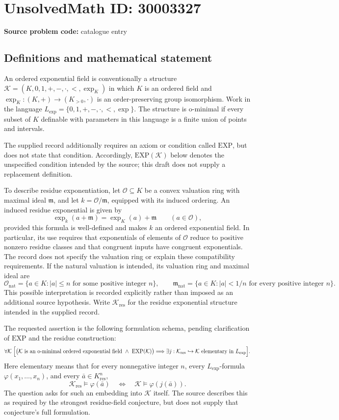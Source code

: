 \documentclass[11pt]{article}
\begin{document}
\section*{UnsolvedMath ID: 30003327}
\textbf{Source problem code:} catalogue entry
\subsection{Definitions and mathematical statement}
An ordered exponential field is conventionally a structure \(\mathcal K=(K,0,1,+,-,\cdot,<,\exp_K)\) in which \(K\) is an ordered field and \(\exp_K:(K,+)\to(K_{>0},\cdot)\) is an order-preserving group isomorphism. Work in the language \(L_{\exp}=\{0,1,+,-,\cdot,<,\exp\}\). The structure is o-minimal if every subset of \(K\) definable with parameters in this language is a finite union of points and intervals.

The supplied record additionally requires an axiom or condition called \(\mathrm{EXP}\), but does not state that condition. Accordingly, \(\mathrm{EXP}(\mathcal K)\) below denotes the unspecified condition intended by the source; this draft does not supply a replacement definition.

To describe residue exponentiation, let \(\mathcal O\subseteq K\) be a convex valuation ring with maximal ideal \(\mathfrak m\), and let \(k=\mathcal O/\mathfrak m\), equipped with its induced ordering. An induced residue exponential is given by
\[
\exp_k(a+\mathfrak m)=\exp_K(a)+\mathfrak m\qquad(a\in\mathcal O),
\]
provided this formula is well-defined and makes \(k\) an ordered exponential field. In particular, its use requires that exponentials of elements of \(\mathcal O\) reduce to positive nonzero residue classes and that congruent inputs have congruent exponentials. The record does not specify the valuation ring or explain these compatibility requirements. If the natural valuation is intended, its valuation ring and maximal ideal are
\[
\mathcal O_{\mathrm{nat}}=\{a\in K: |a|\le n\text{ for some positive integer }n\},
\qquad
\mathfrak m_{\mathrm{nat}}=\{a\in K: |a|<1/n\text{ for every positive integer }n\}.
\]
This possible interpretation is recorded explicitly rather than imposed as an additional source hypothesis. Write \(\mathcal K_{\mathrm{res}}\) for the residue exponential structure intended in the supplied record.

The requested assertion is the following formulation schema, pending clarification of \(\mathrm{EXP}\) and the residue construction:
\[
\forall\mathcal K\;\Bigl[
\bigl(\mathcal K\text{ is an o-minimal ordered exponential field}\ \land\ \mathrm{EXP}(\mathcal K)\bigr)
\Longrightarrow
\exists j:\mathcal K_{\mathrm{res}}\hookrightarrow\mathcal K\text{ elementary in }L_{\exp}
\Bigr].
\]
Here elementary means that for every nonnegative integer \(n\), every \(L_{\exp}\)-formula \(\varphi(x_1,\ldots,x_n)\), and every \(\bar a\in K_{\mathrm{res}}^n\),
\[
\mathcal K_{\mathrm{res}}\models\varphi(\bar a)
\quad\Longleftrightarrow\quad
\mathcal K\models\varphi(j(\bar a)).
\]
The question asks for such an embedding into \(\mathcal K\) itself. The source describes this as required by the strongest residue-field conjecture, but does not supply that conjecture's full formulation.
\end{document}
